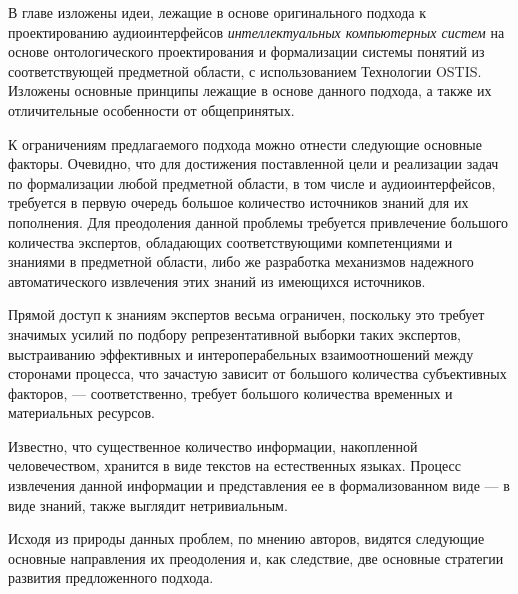 В главе изложены идеи, лежащие в основе оригинального подхода к проектированию аудиоинтерфейсов \textit{интеллектуальных компьютерных систем} на основе онтологического проектирования и формализации системы понятий из соответствующей предметной области, с использованием Технологии OSTIS. Изложены основные принципы лежащие в основе данного подхода, а также их отличительные особенности от общепринятых.

К ограничениям предлагаемого подхода можно отнести следующие основные факторы. Очевидно, что для достижения поставленной цели и реализации задач по формализации любой предметной области, в том числе и аудиоинтерфейсов, требуется в первую очередь большое количество источников знаний для их пополнения. Для преодоления данной проблемы требуется привлечение большого количества экспертов, обладающих соответствующими компетенциями и знаниями в предметной области, либо же разработка механизмов надежного автоматического извлечения этих знаний из имеющихся источников.

Прямой доступ к знаниям экспертов весьма ограничен, поскольку это требует значимых усилий по подбору репрезентативной выборки таких экспертов, выстраиванию эффективных и интероперабельных взаимоотношений между сторонами процесса, что зачастую зависит от большого количества субъективных факторов, --- соответственно, требует большого количества временных и материальных ресурсов.

Известно, что существенное количество информации, накопленной человечеством, хранится в виде текстов на естественных языках. Процесс извлечения данной информации и представления ее в формализованном виде --- в виде знаний, также выглядит нетривиальным.
 
Исходя из природы данных проблем, по мнению авторов, видятся следующие основные направления их преодоления и, как следствие, две основные стратегии развития предложенного подхода.

